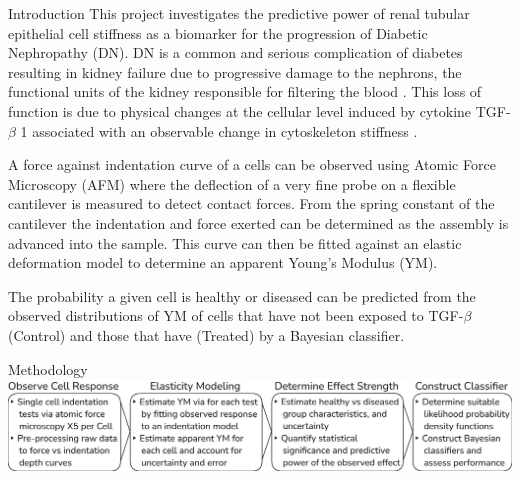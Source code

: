 \documentclass[a0paper,portrait]{baposter}
\begin{document}
\begin{poster}
\begin{posterbox}[name=intro,span=2,column=1,row=0]{Introduction}
This project investigates the predictive power of renal tubular epithelial cell stiffness as a biomarker for the progression of Diabetic Nephropathy (DN). 
DN is a common and serious complication of diabetes resulting in kidney failure due to progressive damage to the nephrons, the functional units of the kidney responsible for filtering the blood \cite{metcalfeW2007-HowDoesEarlyChronicKidneyDiseaseProgress}.
This loss of function is due to physical changes at the cellular level induced by cytokine TGF-$\beta$ 1 associated with an observable change in cytoskeleton stiffness \cite{hillsCE2012-TGFvModulatesCelltocell}. 

\begin{minipage}[t]{0.775\linewidth}
  \vspace{0pt}
  A force against indentation curve of a cells can be observed using Atomic Force Microscopy (AFM) where the deflection of a very fine probe on a flexible cantilever is measured to detect contact forces. 
  From the spring constant of the cantilever the indentation and force exerted can be determined as the assembly is advanced into the sample. 
  This curve can then be fitted against an elastic deformation model to determine an apparent Young's Modulus (YM). 
\end{minipage}
\hfill
\begin{minipage}[t]{0.2\linewidth}
  \vspace{-10pt}
  \centering
  
\end{minipage}
\vspace{1em}

The probability a given cell is healthy or diseased can be predicted from the observed distributions of YM of cells that have not been exposed to TGF-$\beta$ (Control) and those that have (Treated) by a Bayesian classifier.

\end{posterbox}


\begin{posterbox}[name=method,span=2,column=1,below=intro]{Methodology}
\includegraphics[width=\linewidth]{images/Methodology Summary Blocks 1.png}
% 
\end{posterbox}


\end{poster}
\end{document}

